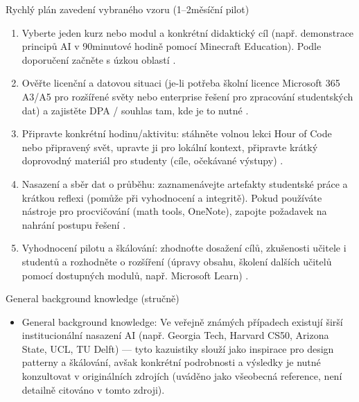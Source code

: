 Rychlý plán zavedení vybraného vzoru (1–2měsíční pilot)
\begin{enumerate}
  \item Vyberte jeden kurz nebo modul a konkrétní didaktický cíl (např. demonstrace principů AI v 90minutové hodině pomocí Minecraft Education). Podle doporučení začněte s úzkou oblastí \cite{kb_ai_101_tipu_pdf_04e4a115_page_54_1}.
  \item Ověřte licenční a datovou situaci (je-li potřeba školní licence Microsoft 365 A3/A5 pro rozšířené světy nebo enterprise řešení pro zpracování studentských dat) a zajistěte DPA / souhlas tam, kde je to nutné \cite{kb_ai_101_tipu_pdf_04e4a115_page_15_2}.
  \item Připravte konkrétní hodinu/aktivitu: stáhněte volnou lekci Hour of Code nebo připravený svět, upravte ji pro lokální kontext, připravte krátký doprovodný materiál pro studenty (cíle, očekávané výstupy) \cite{kb_ai_101_tipu_pdf_04e4a115_page_15_2}.
  \item Nasazení a sběr dat o průběhu: zaznamenávejte artefakty studentské práce a krátkou reflexi (pomůže při vyhodnocení a integritě). Pokud používáte nástroje pro procvičování (math tools, OneNote), zapojte požadavek na nahrání postupu řešení \cite{kb_ai_101_tipu_pdf_04e4a115_page_8_1}.
  \item Vyhodnocení pilotu a škálování: zhodnoťte dosažení cílů, zkušenosti učitele i studentů a rozhodněte o rozšíření (úpravy obsahu, školení dalších učitelů pomocí dostupných modulů, např. Microsoft Learn) \cite{kb_ai_101_tipu_pdf_04e4a115_page_54_1}.
\end{enumerate}

General background knowledge (stručně)
\begin{itemize}
  \item General background knowledge: Ve veřejně známých případech existují širší institucionální nasazení AI (např. Georgia Tech, Harvard CS50, Arizona State, UCL, TU Delft) — tyto kazuistiky slouží jako inspirace pro design patterny a škálování, avšak konkrétní podrobnosti a výsledky je nutné konzultovat v originálních zdrojích (uváděno jako všeobecná reference, není detailně citováno v tomto zdroji).
\end{itemize}